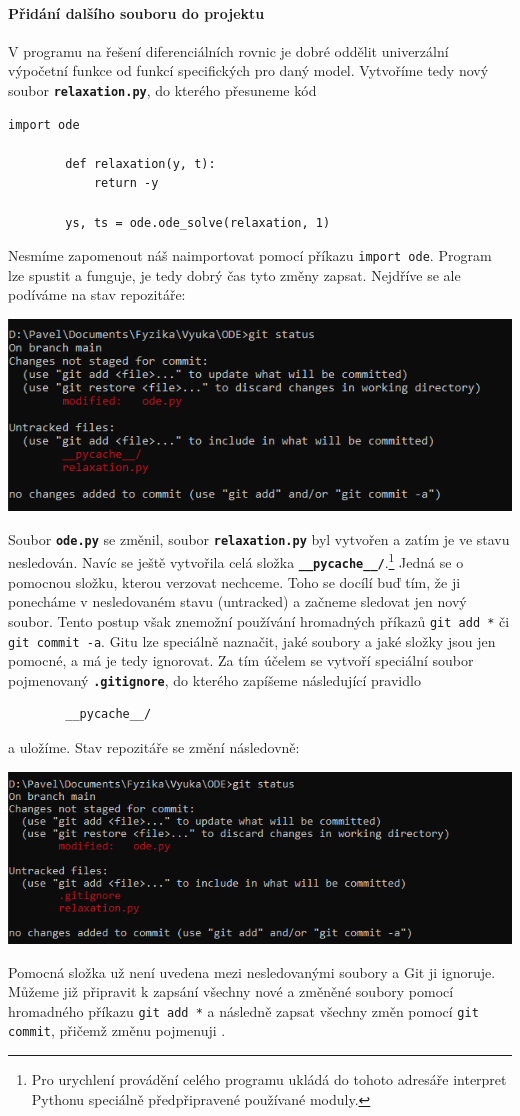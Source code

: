 \documentclass[a4paper,11pt,twoside]{article}
\newcommand{\subsubsubsection}[1]{\paragraph{#1}\mbox{}

}
\def\code#1{\textnormal{\texttt{#1}}}
\def\file#1{\textnormal{\textbf{\texttt{#1}}}}
\theoremstyle{red}
\theoremstyle{green}
\begin{document}
\subsubsubsection{Přidání dalšího souboru do projektu}
    V programu na řešení diferenciálních rovnic je dobré oddělit univerzální výpočetní funkce od funkcí specifických pro daný model.
    Vytvoříme tedy nový soubor \file{relaxation.py}, do kterého přesuneme kód
    \begin{lstlisting}[style=TinyPython]
        import ode

        def relaxation(y, t):
            return -y
        
        ys, ts = ode.ode_solve(relaxation, 1)\end{lstlisting}
    Nesmíme zapomenout náš  naimportovat pomocí příkazu \code{import ode}.
    Program lze spustit a funguje, je tedy dobrý čas tyto změny zapsat.
    Nejdříve se ale podíváme na stav repozitáře:    
    \begin{center}\includegraphics[width=0.7\linewidth]{GitStatusChange2.png}\end{center}
    Soubor \file{ode.py} se změnil, soubor \file{relaxation.py} byl vytvořen a zatím je ve stavu nesledován.
    Navíc se ještě vytvořila celá složka \file{__pycache__/}.\footnote{
        Pro urychlení provádění celého programu ukládá do tohoto adresáře interpret Pythonu speciálně předpřipravené používané moduly.
    }
    Jedná se o pomocnou složku, kterou verzovat nechceme.
    Toho se docílí buď tím, že ji ponecháme v nesledovaném stavu (untracked) a začneme sledovat jen nový soubor.
    Tento postup však znemožní používání hromadných příkazů \code{git add *} či \code{git commit -a}.
    Gitu lze speciálně naznačit, jaké soubory a jaké složky jsou jen pomocné, a má je tedy ignorovat.
    Za tím účelem se vytvoří speciální soubor pojmenovaný \file{.gitignore}, do kterého zapíšeme následující pravidlo
    \begin{lstlisting}
        __pycache__/\end{lstlisting}
    a uložíme.
    Stav repozitáře se změní následovně:
    \begin{center}\includegraphics[width=0.7\linewidth]{GitStatusIgnore.png}\end{center}
    Pomocná složka už není uvedena mezi nesledovanými soubory a Git ji ignoruje.
    Můžeme již připravit k zapsání všechny nové a změněné soubory pomocí hromadného příkazu \code{git add *} a následně zapsat všechny změn pomocí \code{git commit},
    přičemž změnu pojmenuji .
\end{document}
